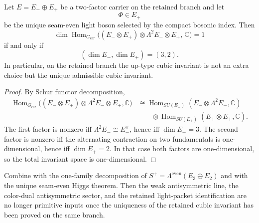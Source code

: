 \begin{lemma}
\label{lem:unique-cubic-weak-invariant}
Let $E=E_-\oplus E_+$ be a two-factor carrier on the retained branch and let
\[
\Phi\in E_+
\]
be the unique seam-even light boson selected by the compact bosonic index. Then
\[
\dim \operatorname{Hom}_{G_{\mathrm{car}}}\bigl((E_-\otimes E_+)\otimes \Lambda^2 E_-\otimes E_+,\,\mathbb C\bigr)=1
\]
if and only if
\[
(\dim E_-,\dim E_+)=(3,2).
\]
In particular, on the retained branch the up-type cubic invariant is not an extra choice but the
unique admissible cubic invariant.
\end{lemma}

\begin{proof}
By Schur functor decomposition,
\[
\begin{aligned}
\operatorname{Hom}_{G_{\mathrm{car}}}\bigl((E_-\otimes E_+)\otimes \Lambda^2 E_-\otimes E_+,\mathbb C\bigr)
&\cong
\operatorname{Hom}_{SU(E_-)}(E_-\otimes \Lambda^2E_-,\mathbb C)
\\
&\qquad\otimes
\operatorname{Hom}_{SU(E_+)}(E_+\otimes E_+,\mathbb C).
\end{aligned}
\]
The first factor is nonzero iff $\Lambda^2E_-\cong E_-^\vee$, hence iff $\dim E_-=3$. The second
factor is nonzero iff the alternating contraction on two fundamentals is one-dimensional, hence iff
$\dim E_+=2$. In that case both factors are one-dimensional, so the total invariant space is
one-dimensional.
\end{proof}

\begin{corollary}
\label{cor:yukawa-discharges-kpp}
Combine  with the
one-family decomposition of
$S^+=\Lambda^{\mathrm{even}}(E_3\oplus E_2)$ and with the unique seam-even Higgs theorem. Then the
weak antisymmetric line, the color-dual antisymmetric sector, and the retained light-packet
identification are no longer primitive inputs once the uniqueness of the retained cubic invariant
has been proved on the same branch.
\end{corollary}


